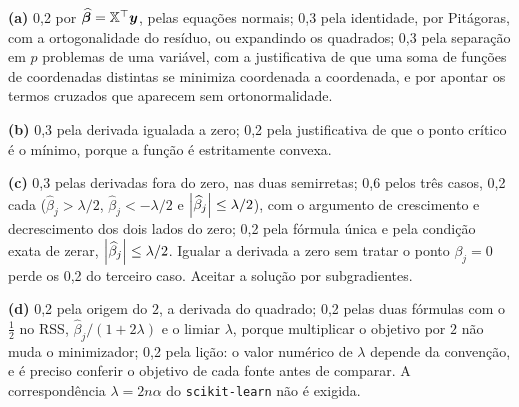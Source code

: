 \documentclass[11pt,a4paper]{article}
\begin{document}


\begin{criterio}
\textbf{(a)} 0,2 por $\widehat{\bm{\beta}}=\mathbb{X}^\top\bm y$, pelas equações normais; 0,3 pela
identidade, por Pitágoras, com a ortogonalidade do resíduo, ou expandindo os quadrados;
0,3 pela separação em $p$ problemas de uma variável, com a justificativa de que uma soma
de funções de coordenadas distintas se minimiza coordenada a coordenada, e por apontar os
termos cruzados que aparecem sem ortonormalidade.

\textbf{(b)} 0,3 pela derivada igualada a zero; 0,2 pela justificativa de que o ponto
crítico é o mínimo, porque a função é estritamente convexa.

\textbf{(c)} 0,3 pelas derivadas fora do zero, nas duas semirretas; 0,6 pelos três casos,
0,2 cada ($\widehat\beta_j>\lambda/2$, $\widehat\beta_j<-\lambda/2$ e
$\left\lvert \widehat\beta_j \right\rvert\le\lambda/2$), com o argumento de crescimento e decrescimento dos
dois lados do zero; 0,2 pela fórmula única e pela condição exata de zerar,
$\left\lvert \widehat\beta_j \right\rvert\le\lambda/2$. Igualar a derivada a zero sem tratar o ponto
$\beta_j=0$ perde os 0,2 do terceiro caso. Aceitar a solução por subgradientes.

\textbf{(d)} 0,2 pela origem do $2$, a derivada do quadrado; 0,2 pelas duas fórmulas com o
$\tfrac12$ no RSS, $\widehat\beta_j/(1+2\lambda)$ e o limiar $\lambda$, porque multiplicar
o objetivo por $2$ não muda o minimizador; 0,2 pela lição: o valor numérico de $\lambda$
depende da convenção, e é preciso conferir o objetivo de cada fonte antes de comparar. A
correspondência $\lambda=2n\alpha$ do \texttt{scikit-learn} não é exigida.
\end{criterio}


\end{document}
